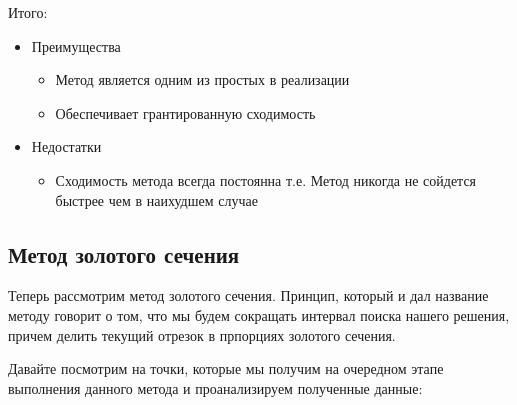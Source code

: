 \documentclass[a4paper, 14pt]{article}
\begin{document}
	Итого: 
	\begin{itemize}
		\item Преимущества
			\begin{itemize}
				\item Метод является одним из простых в реализации
				\item Обеспечивает грантированную сходимость
			\end{itemize}
		\item Недостатки
			\begin{itemize}
			\item Сходимость метода всегда постоянна т.е. Метод никогда не сойдется быстрее чем в наихудшем случае
			\end{itemize}
	\end{itemize}
	
	\subsection*{Метод золотого сечения}
	Теперь рассмотрим метод золотого сечения. Принцип, который и дал название методу говорит о том, что мы будем сокращать интервал поиска нашего решения, причем делить текущий отрезок в прпорциях золотого сечения.
	
	Давайте посмотрим на точки, которые мы получим на очередном этапе выполнения данного метода и проанализируем полученные данные:\\
	
\end{document}
